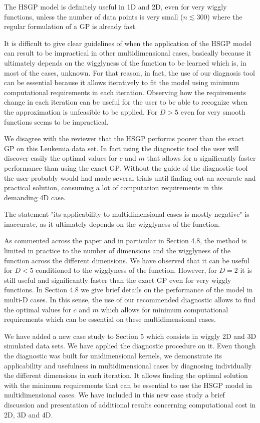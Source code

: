 \documentclass[11pt]{report}
\begin{document}
The HSGP model is definitely useful in 1D and 2D, even for very wiggly functions, unless the number of data points is very small ($n \lesssim 300$) where the regular formulation of a GP is already fast.

It is difficult to give clear guidelines of when the application of the HSGP model can result to be impractical in other multidimensional cases, basically because it ultimately depends on the wigglyness of the function to be learned which is, in most of the cases, unknown. For that reason, in fact, the use of our diagnosis tool can be essential because it allows iteratively to fit the model using minimum computational requirements in each iteration. Observing how the requirements change in each iteration can be useful for the user to be able to recognize when the approximation is unfeasible to be applied. For $D>5$ even for very smooth functions seems to be impractical.

We disagree with the reviewer that the HSGP performs poorer than the exact GP on this Leukemia data set. In fact using the diagnostic tool the user will discover easily the optimal values for $c$ and $m$ that allows for a significantly faster performance than using the exact GP. Without the guide of the diagnostic tool the user probably would had made several trials until finding out an accurate and practical solution, consuming a lot of computation requirements in this demanding 4D case.

The statement "its applicability to multidimensional cases is mostly negative" is inaccurate, as it ultimately depends on the wigglyness of the function.

As commented across the paper and in particular in Section 4.8, the method is limited in practice to the number of dimensions and the wigglyness of the function across the different dimensions. We have observed that it can be useful for $D<5$ conditioned to the wigglyness of the function. However, for $D=2$ it is still useful and significantly faster than the exact GP even for very wiggly functions. In Section 4.8 we give brief details on the performance of the model in multi-D cases. In this sense, the use of our recommended diagnostic allows to find the optimal values for $c$ and $m$ which allows for minimum computational requirements which can be essential on these multidimensional cases.

We have added a new case study to Section 5 which consists in wiggly 2D and 3D simulated data sets. We have applied the diagnostic procedure on it. Even though the diagnostic was built for unidimensional kernels, we demonstrate its applicability and usefulness in multidimensional cases by diagnosing individually the different dimensions in each iteration. It allows finding the  optimal solution with the minimum requirements that can be essential to use the HSGP model in multidimensional cases. We have included in this new case study a brief discussion and presentation of additional results concerning computational cost in 2D, 3D and 4D.
\end{document}
